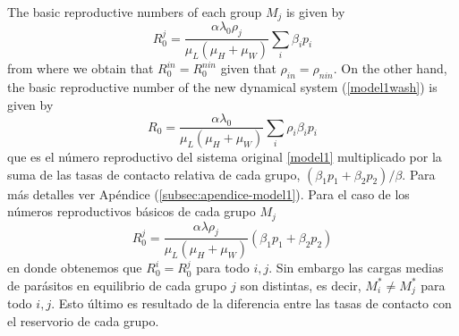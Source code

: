 \documentclass[12pt,a4paper]{article}
\theoremstyle{plain}%
\theoremstyle{definition}
\theoremstyle{remark}
\begin{document}
	The basic reproductive numbers of each group $M_j$ is given by
	\begin{equation}
	R_{0}^j=\frac{ \alpha \lambda_0 \rho_j}{\mu_L(\mu_{H}+\mu_W)} \sum_i\beta_i p_i 
	\end{equation}
	from where we obtain that $R_{0}^{in}=R_{0}^{nin}$ given that $\rho_{in}=\rho_{nin}$.
	On the other hand, the basic reproductive number of the new dynamical system (\ref{model1wash}) is given by
	\begin{equation}
	R_0=\frac{ \alpha \lambda_0 }{ \mu_L (\mu_H+\mu_W)} \sum_i \rho_i \beta_i p_i 
	\end{equation}
	que es el número reproductivo del sistema original \eqref{model1} multiplicado por la suma de las tasas de contacto relativa de cada grupo, $(\beta_1 p_1 + \beta_2 p_2)/\beta$. 
	Para más detalles ver Apéndice (\ref{subsec:apendice-model1}).
	Para el caso de los números reproductivos básicos de cada grupo $M_j$
	\begin{equation}
	R_{0}^j=\frac{ \alpha \lambda \rho_j}{\mu_L(\mu_{H}+\mu_W)} (\beta_1 p_1 + \beta_2 p_2)
	\end{equation}
	en donde obtenemos que $R_{0}^i=R_{0}^j$ para todo $i,j$.
	Sin embargo las cargas medias de parásitos en equilibrio de cada grupo $j$ son distintas, es decir, $M_i^*\neq M_j^*$ para todo $i,j$. 
	Esto último es resultado de  la diferencia entre las tasas de contacto con el reservorio de cada grupo.
	
\end{document}
